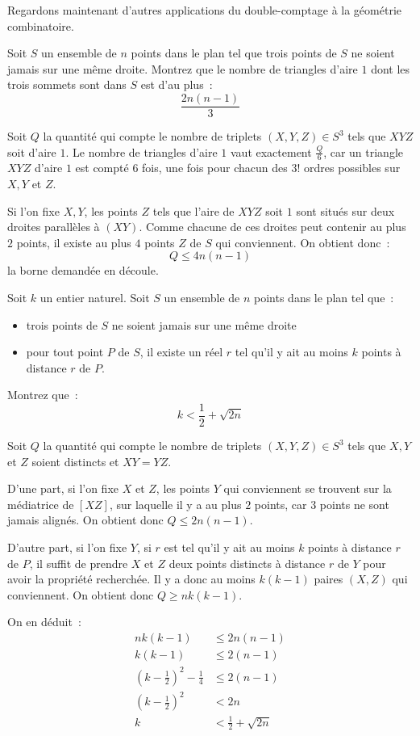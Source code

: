 Regardons maintenant d'autres applications du double-comptage à la géométrie combinatoire.

\begin{exo}[Iran 2010]
Soit $S$ un ensemble de $n$ points dans le plan tel que trois points de $S$ ne soient jamais sur une même droite.
Montrez que le nombre de triangles d'aire $1$ dont les trois sommets sont dans $S$ est d'au plus~:
$$\frac{2n(n - 1)}{3}$$
\end{exo}
\begin{sol}
Soit $Q$ la quantité qui compte le nombre de triplets $(X, Y, Z) \in S^3$ tels que $XYZ$ soit d'aire $1$.
Le nombre de triangles d'aire $1$ vaut exactement $\frac{Q}{6}$, car un triangle $XYZ$ d'aire $1$ est compté $6$ fois, une fois pour chacun des $3!$ ordres possibles sur $X, Y$ et $Z$.

Si l'on fixe $X, Y$, les points $Z$ tels que l'aire de $XYZ$ soit $1$ sont situés sur deux droites parallèles à $(XY)$. Comme chacune de ces droites peut contenir au plus $2$ points, il existe au plus $4$ points $Z$ de $S$ qui conviennent.
On obtient donc~:
$$Q \le 4n(n - 1)$$
la borne demandée en découle.
\end{sol}

\begin{exo}[IMO 1987]
Soit $k$ un entier naturel.
Soit $S$ un ensemble de $n$ points dans le plan tel que~:
\begin{itemize}
\item trois points de $S$ ne soient jamais sur une même droite
\item pour tout point $P$ de $S$, il existe un réel $r$ tel qu'il y ait au moins $k$ points à distance $r$ de $P$.
\end{itemize}
Montrez que~:
$$k < \frac12 + \sqrt{2n}$$
\end{exo}
\begin{sol}
Soit $Q$ la quantité qui compte le nombre de triplets $(X, Y, Z) \in S^3$ tels que $X, Y$ et $Z$ soient distincts et $XY = YZ$.

D'une part, si l'on fixe $X$ et $Z$, les points $Y$ qui conviennent se trouvent sur la médiatrice de $[XZ]$, sur laquelle il y a au plus $2$ points, car $3$ points ne sont jamais alignés.
On obtient donc $Q \le 2n(n - 1)$.

D'autre part, si l'on fixe $Y$, si $r$ est tel qu'il y ait au moins $k$ points à distance $r$ de $P$, il suffit de prendre $X$ et $Z$ deux points distincts à distance $r$ de $Y$ pour avoir la propriété recherchée. Il y a donc au moins $k(k - 1)$ paires $(X, Z)$ qui conviennent.
On obtient donc $Q \ge nk(k - 1)$.

On en déduit~:
\begin{align*}
nk(k - 1) & \le 2n(n - 1) \\
k(k - 1) & \le 2(n - 1) \\
(k - \frac12)^2 - \frac1{4} & \le 2(n - 1) \\
(k - \frac12)^2 & < 2n \\
k & < \frac12 + \sqrt{2n}
\end{align*}
\end{sol}

